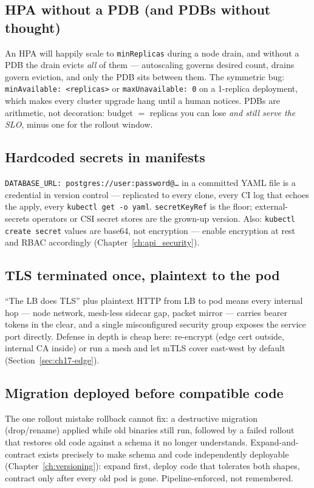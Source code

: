 \subsection*{HPA without a PDB (and PDBs without thought)}
An HPA will happily scale to \texttt{minReplicas} during a node drain,
and without a PDB the drain evicts \emph{all} of them --- autoscaling
governs desired count, drains govern eviction, and only the PDB sits
between them. The symmetric bug: \texttt{minAvailable: <replicas>} or
\texttt{maxUnavailable: 0} on a 1-replica deployment, which makes every
cluster upgrade hang until a human notices. PDBs are arithmetic, not
decoration: budget $=$ replicas you can lose \emph{and still serve the
SLO}, minus one for the rollout window.

\subsection*{Hardcoded secrets in manifests}
\texttt{DATABASE\_URL: postgres://user:password@\ldots} in a committed
YAML file is a credential in version control --- replicated to every
clone, every CI log that echoes the apply, every \texttt{kubectl get -o
yaml}. \texttt{secretKeyRef} is the floor; external-secrets operators or
CSI secret stores are the grown-up version. Also: \texttt{kubectl
create secret} values are base64, not encryption --- enable encryption at
rest and RBAC accordingly (Chapter~\ref{ch:api_security}).

\subsection*{TLS terminated once, plaintext to the pod}
``The LB does TLS'' plus plaintext HTTP from LB to pod means every
internal hop --- node network, mesh-less sidecar gap, packet mirror ---
carries bearer tokens in the clear, and a single misconfigured security
group exposes the service port directly. Defense in depth is cheap here:
re-encrypt (edge cert outside, internal CA inside) or run a mesh and let
mTLS cover east-west by default (Section~\ref{sec:ch17-edge}).

\subsection*{Migration deployed before compatible code}
The one rollout mistake rollback cannot fix: a destructive migration
(drop/rename) applied while old binaries still run, followed by a failed
rollout that restores old code against a schema it no longer
understands. Expand-and-contract exists precisely to make schema and
code independently deployable (Chapter~\ref{ch:versioning}): expand
first, deploy code that tolerates both shapes, contract only after every
old pod is gone. Pipeline-enforced, not remembered.

